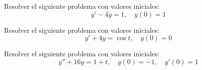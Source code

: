 \documentclass[11pt]{article}
\begin{document}
\begin{question} %
    Resolver el siguiente problema con valores iniciales:
    \[ y' - 4 y = 1, \quad y(0) = 1 \]
\end{question}

\begin{question} %
    Resolver el siguiente problema con valores iniciales:
    \[ y' + 4 y = \cos t, \quad y(0) = 0 \]
\end{question}

\begin{question} %
    Resolver el siguiente problema con valores iniciales:
    \[ y'' + 16 y = 1 + t, \quad y(0) = -1, \quad y'(0) = 1 \]
\end{question}
\end{document}
